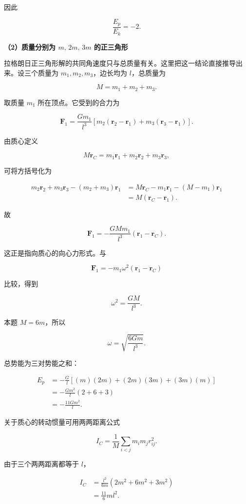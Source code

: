 \documentclass[12pt,a4paper,UTF8]{ctexart}
\begin{document}
因此

\[
\boxed{\frac{E_p}{E_k}=-2}.
\tag{5}
\]

\textbf{（2）质量分别为 \(m,\,2m,\,3m\) 的正三角形}

拉格朗日正三角形解的共同角速度只与总质量有关。这里把这一结论直接推导出来。设三个质量为
\(m_1,m_2,m_3\)，边长均为 \(l\)，总质量为

\[
M=m_1+m_2+m_3.
\]

取质量 \(m_1\) 所在顶点。它受到的合力为

\[
\bm F_1
=\frac{Gm_1}{l^3}\left[m_2(\bm r_2-\bm r_1)+m_3(\bm r_3-\bm r_1)\right].
\]

由质心定义

\[
M\bm r_C=m_1\bm r_1+m_2\bm r_2+m_3\bm r_3,
\]

可将方括号化为

\[
\begin{aligned}
m_2\bm r_2+m_3\bm r_3-(m_2+m_3)\bm r_1
&=M\bm r_C-m_1\bm r_1-(M-m_1)\bm r_1\\
&=M(\bm r_C-\bm r_1).
\end{aligned}
\]

故

\[
\bm F_1=-\frac{GMm_1}{l^3}(\bm r_1-\bm r_C).
\tag{6}
\]

这正是指向质心的向心力形式。与

\[
\bm F_1=-m_1\omega^2(\bm r_1-\bm r_C)
\]

比较，得到

\[
\omega^2=\frac{GM}{l^3}.
\]

本题 \(M=6m\)，所以

\[
\boxed{\omega=\sqrt{\frac{6Gm}{l^3}}}.
\tag{7}
\]

总势能为三对势能之和：

\[
\begin{aligned}
E_p
&=-\frac{G}{l}\left[(m)(2m)+(2m)(3m)+(3m)(m)\right]\\
&=-\frac{Gm^2}{l}(2+6+3)\\
&=-\frac{11Gm^2}{l}.
\end{aligned}
\tag{8}
\]

关于质心的转动惯量可用两两距离公式

\[
I_C=\frac1M\sum_{i<j}m_im_jr_{ij}^2.
\]

由于三个两两距离都等于 \(l\)，

\[
\begin{aligned}
I_C
&=\frac{l^2}{6m}\left(2m^2+6m^2+3m^2\right)\\
&=\frac{11}{6}ml^2.
\end{aligned}
\tag{9}
\]
\end{document}
